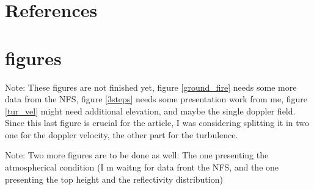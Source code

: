 \documentclass[12pt]{article}
\begin{document}
\section{References}

\section{figures}

{\color{red} Note: These figures are not finished yet, figure \ref{ground_fire} needs some more data from the NFS, figure \ref{3steps} needs some presentation work from me, figure \ref{tur_vel} might need additional elevation, and maybe the single doppler field. Since this last figure is crucial for the article, I was considering splitting it in two one for the doppler velocity, the other part for the turbulence.}

\vspace{0.5cm}

{\color{red} Note: Two more figures are to be done as well: The one presenting the atmospherical condition (I m waitng for data front the NFS, and the one presenting the top height and the reflectivity distribution)}
\end{document}
